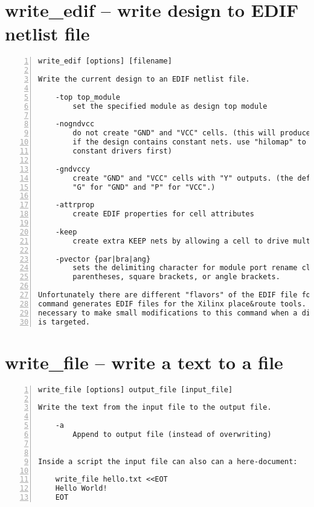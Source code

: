 \section{write\_edif -- write design to EDIF netlist file}
\label{cmd:write_edif}
\begin{lstlisting}[numbers=left,frame=single]
    write_edif [options] [filename]

Write the current design to an EDIF netlist file.

    -top top_module
        set the specified module as design top module

    -nogndvcc
        do not create "GND" and "VCC" cells. (this will produce an error
        if the design contains constant nets. use "hilomap" to map to custom
        constant drivers first)

    -gndvccy
        create "GND" and "VCC" cells with "Y" outputs. (the default is
        "G" for "GND" and "P" for "VCC".)

    -attrprop
        create EDIF properties for cell attributes

    -keep
        create extra KEEP nets by allowing a cell to drive multiple nets.

    -pvector {par|bra|ang}
        sets the delimiting character for module port rename clauses to
        parentheses, square brackets, or angle brackets.

Unfortunately there are different "flavors" of the EDIF file format. This
command generates EDIF files for the Xilinx place&route tools. It might be
necessary to make small modifications to this command when a different tool
is targeted.
\end{lstlisting}

\section{write\_file -- write a text to a file}
\label{cmd:write_file}
\begin{lstlisting}[numbers=left,frame=single]
    write_file [options] output_file [input_file]

Write the text from the input file to the output file.

    -a
        Append to output file (instead of overwriting)


Inside a script the input file can also can a here-document:

    write_file hello.txt <<EOT
    Hello World!
    EOT
\end{lstlisting}

